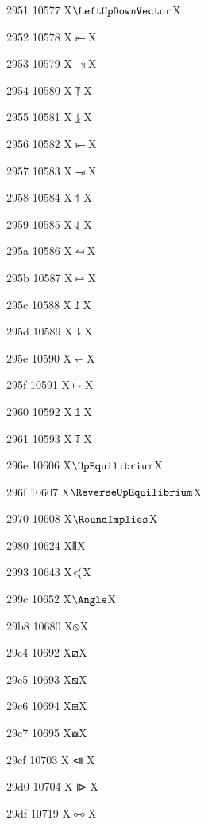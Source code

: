 \documentclass[11pt]{article}
\begin{document}
2951 10577 X{\ensuremath{\LeftUpDownVector}}X

2952 10578 X{\ensuremath{\LeftVectorBar}}X

2953 10579 X{\ensuremath{\RightVectorBar}}X

2954 10580 X{\ensuremath{\RightUpVectorBar}}X

2955 10581 X{\ensuremath{\RightDownVectorBar}}X

2956 10582 X{\ensuremath{\DownLeftVectorBar}}X

2957 10583 X{\ensuremath{\DownRightVectorBar}}X

2958 10584 X{\ensuremath{\LeftUpVectorBar}}X

2959 10585 X{\ensuremath{\LeftDownVectorBar}}X

295a 10586 X{\ensuremath{\LeftTeeVector}}X

295b 10587 X{\ensuremath{\RightTeeVector}}X

295c 10588 X{\ensuremath{\RightUpTeeVector}}X

295d 10589 X{\ensuremath{\RightDownTeeVector}}X

295e 10590 X{\ensuremath{\DownLeftTeeVector}}X

295f 10591 X{\ensuremath{\DownRightTeeVector}}X

2960 10592 X{\ensuremath{\LeftUpTeeVector}}X

2961 10593 X{\ensuremath{\LeftDownTeeVector}}X

296e 10606 X{\ensuremath{\UpEquilibrium}}X

296f 10607 X{\ensuremath{\ReverseUpEquilibrium}}X

2970 10608 X{\ensuremath{\RoundImplies}}X

2980 10624 X{\ensuremath{\Vvert}}X

2993 10643 X{\ensuremath{<\kern-0.58em(}}X

299c 10652 X{\ensuremath{\Angle}}X

29b8 10680 X{\ensuremath{\obslash}}X

29c4 10692 X{\ensuremath{\boxdiag}}X

29c5 10693 X{\ensuremath{\boxbslash}}X

29c6 10694 X{\ensuremath{\boxast}}X

29c7 10695 X{\ensuremath{\boxcircle}}X

29cf 10703 X{\ensuremath{\LeftTriangleBar}}X

29d0 10704 X{\ensuremath{\RightTriangleBar}}X

29df 10719 X{\ensuremath{\dualmap}}X
\end{document}
